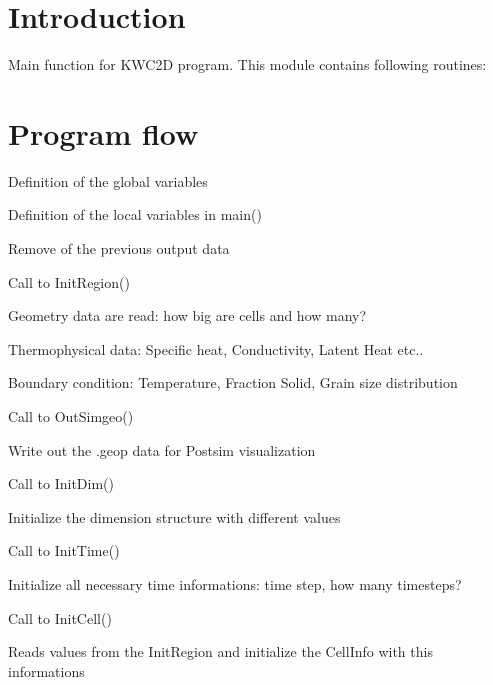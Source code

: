 \hypertarget{index_Introduction}{}\section{Introduction}\label{index_Introduction}
Main function for K\+W\+C2\+D program. This module contains following routines\+:

\section*{Program flow }


\begin{DoxyItemize}
\item Definition of the global variables
\item Definition of the local variables in main()
\item Remove of the previous output data
\item Call to Init\+Region()
\begin{DoxyItemize}
\item Geometry data are read\+: how big are cells and how many?
\item Thermophysical data\+: Specific heat, Conductivity, Latent Heat etc..
\item Boundary condition\+: Temperature, Fraction Solid, Grain size distribution
\end{DoxyItemize}
\item Call to Out\+Simgeo()
\begin{DoxyItemize}
\item Write out the .geop data for Postsim visualization
\end{DoxyItemize}
\item Call to Init\+Dim()
\begin{DoxyItemize}
\item Initialize the dimension structure with different values
\end{DoxyItemize}
\item Call to Init\+Time()
\begin{DoxyItemize}
\item Initialize all necessary time informations\+: time step, how many timesteps?
\end{DoxyItemize}
\item Call to Init\+Cell()
\begin{DoxyItemize}
\item Reads values from the Init\+Region and initialize the Cell\+Info with this informations 
\end{DoxyItemize}
\end{DoxyItemize}